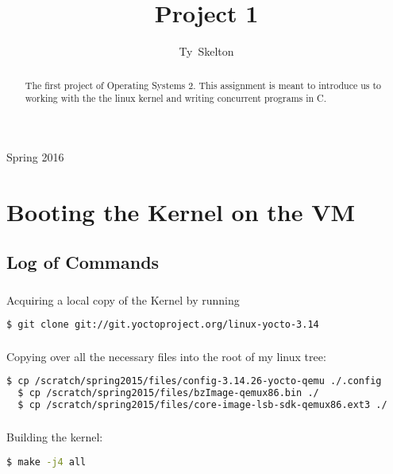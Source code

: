 \documentclass[10pt,draftclsnofoot,onecolumn]{IEEEtran}
\begin{document}
\singlespacing
\title{Project 1}

\author{Ty~Skelton}


%
{Spring 2016}

\maketitle

\begin{abstract}
The first project of Operating Systems 2.
This assignment is meant to introduce us to working with the the linux kernel and writing concurrent programs in C.


\end{abstract}
\IEEEpeerreviewmaketitle

\newpage
{}

\section{Booting the Kernel on the VM}

\subsection{Log of Commands}

\subsubsection{}
Acquiring a local copy of the Kernel by running
\begin{lstlisting}[language=bash]
  $ git clone git://git.yoctoproject.org/linux-yocto-3.14
\end{lstlisting}

\subsubsection{}
Copying over all the necessary files into the root of my linux tree:
\begin{lstlisting}[language=bash]
  $ cp /scratch/spring2015/files/config-3.14.26-yocto-qemu ./.config
  $ cp /scratch/spring2015/files/bzImage-qemux86.bin ./
  $ cp /scratch/spring2015/files/core-image-lsb-sdk-qemux86.ext3 ./
\end{lstlisting}

\subsubsection{}
Building the kernel:
\begin{lstlisting}[language=bash]
  $ make -j4 all
\end{lstlisting}
\end{document}
